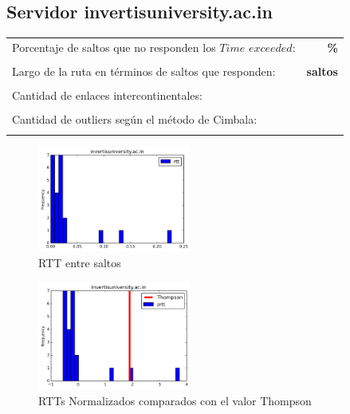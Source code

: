 \subsection{Servidor invertisuniversity.ac.in}

\begin{center}
\begin{tabular}{p{6.5cm}r}
Porcentaje de saltos que no responden los $Time$ $exceeded$: & \textbf{\%} \\ \\ 
Largo de la ruta en términos de saltos que responden: &\textbf{ saltos} \\ \\
Cantidad de enlaces intercontinentales: & \textbf{} \\ \\
Cantidad de outliers según el método de Cimbala: & \textbf{} \\ \\
\end{tabular}
\end{center}

\begin{figure}[H]
  \centering
    \includegraphics[width=0.45\textwidth]{histogramas_rtt/invertisuniversity-ac-in.png}
  \caption{RTT entre saltos}
  \label{entropia-s}
\end{figure}

\begin{figure}[H]
  \centering
    \includegraphics[width=0.45\textwidth]{histogramas_thompson/invertisuniversity-ac-in.png}
  \caption{RTTs Normalizados comparados con el valor Thompson}
  \label{entropia-s}
\end{figure}

